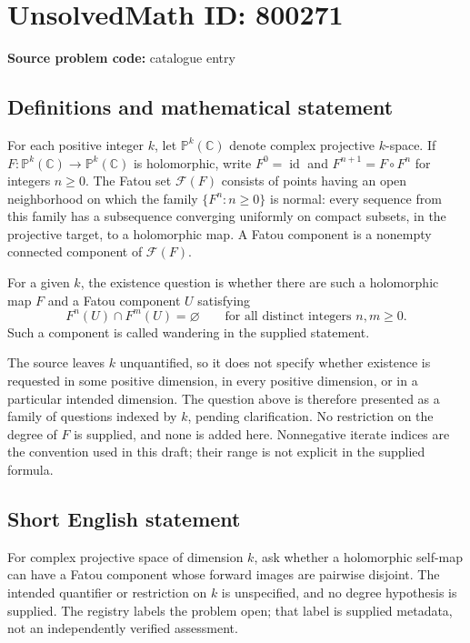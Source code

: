 \documentclass[11pt]{article}
\newcommand{\C}{\mathbb{C}}
\newcommand{\PP}{\mathbb{P}}
\begin{document}
\section*{UnsolvedMath ID: 800271}
\textbf{Source problem code:} catalogue entry
\subsection{Definitions and mathematical statement}
For each positive integer \(k\), let \(\PP^k(\C)\) denote complex projective \(k\)-space. If \(F:\PP^k(\C)\to\PP^k(\C)\) is holomorphic, write \(F^0=\operatorname{id}\) and \(F^{n+1}=F\circ F^n\) for integers \(n\geq 0\). The Fatou set \(\mathcal F(F)\) consists of points having an open neighborhood on which the family \(\{F^n:n\geq 0\}\) is normal: every sequence from this family has a subsequence converging uniformly on compact subsets, in the projective target, to a holomorphic map. A Fatou component is a nonempty connected component of \(\mathcal F(F)\).

For a given \(k\), the existence question is whether there are such a holomorphic map \(F\) and a Fatou component \(U\) satisfying
\[
F^n(U)\cap F^m(U)=\varnothing
\qquad\text{for all distinct integers }n,m\geq 0.
\]
Such a component is called wandering in the supplied statement.

The source leaves \(k\) unquantified, so it does not specify whether existence is requested in some positive dimension, in every positive dimension, or in a particular intended dimension. The question above is therefore presented as a family of questions indexed by \(k\), pending clarification. No restriction on the degree of \(F\) is supplied, and none is added here. Nonnegative iterate indices are the convention used in this draft; their range is not explicit in the supplied formula.
\subsection{Short English statement}
For complex projective space of dimension \(k\), ask whether a holomorphic self-map can have a Fatou component whose forward images are pairwise disjoint. The intended quantifier or restriction on \(k\) is unspecified, and no degree hypothesis is supplied. The registry labels the problem open; that label is supplied metadata, not an independently verified assessment.
\end{document}
